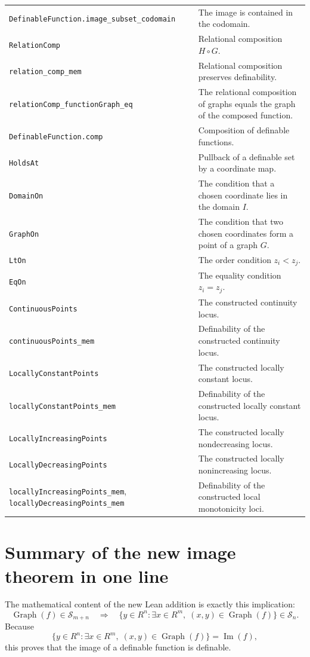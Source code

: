 \documentclass[11pt]{article}
\newcommand{\Sfam}{\mathcal S}
\newcommand{\Graph}{\operatorname{Graph}}
\newcommand{\Imf}{\operatorname{Im}}
\newcommand{\Lean}[1]{\texttt{#1}}
\begin{document}
\begin{longtable}{>{\raggedright\arraybackslash}p{}>{\raggedright\arraybackslash}p{}}
\Lean{DefinableFunction.image\_subset\_codomain} & The image is contained in the codomain. \\
\Lean{RelationComp} & Relational composition $H\circ G$. \\
\Lean{relation\_comp\_mem} & Relational composition preserves definability. \\
\Lean{relationComp\_functionGraph\_eq} & The relational composition of graphs equals the graph of the composed function. \\
\Lean{DefinableFunction.comp} & Composition of definable functions. \\
\Lean{HoldsAt} & Pullback of a definable set by a coordinate map. \\
\Lean{DomainOn} & The condition that a chosen coordinate lies in the domain $I$. \\
\Lean{GraphOn} & The condition that two chosen coordinates form a point of a graph $G$. \\
\Lean{LtOn} & The order condition $z_i<z_j$. \\
\Lean{EqOn} & The equality condition $z_i=z_j$. \\
\Lean{ContinuousPoints} & The constructed continuity locus. \\
\Lean{continuousPoints\_mem} & Definability of the constructed continuity locus. \\
\Lean{LocallyConstantPoints} & The constructed locally constant locus. \\
\Lean{locallyConstantPoints\_mem} & Definability of the constructed locally constant locus. \\
\Lean{LocallyIncreasingPoints} & The constructed locally nondecreasing locus. \\
\Lean{LocallyDecreasingPoints} & The constructed locally nonincreasing locus. \\
\Lean{locallyIncreasingPoints\_mem}, \Lean{locallyDecreasingPoints\_mem} & Definability of the constructed local monotonicity loci. \\
\bottomrule
\end{longtable}

\section{Summary of the new image theorem in one line}

The mathematical content of the new Lean addition is exactly this implication:
\[
  \Graph(f)\in\Sfam_{m+n}
  \quad\Longrightarrow\quad
  \{y\in R^n:\exists x\in R^m,
  \;(x,y)\in\Graph(f)\}
  \in\Sfam_n.
\]
Because
\[
  \{y\in R^n:\exists x\in R^m,
  \;(x,y)\in\Graph(f)\}
  =
  \Imf(f),
\]
this proves that the image of a definable function is definable.
\end{document}
